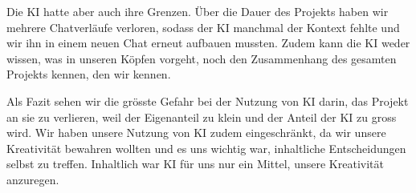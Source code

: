 \documentclass[../Main.tex]{subfiles}
\begin{document}
Die KI hatte aber auch ihre Grenzen. Über die Dauer des Projekts haben wir mehrere Chatverläufe verloren, sodass der KI manchmal der Kontext fehlte und wir ihn in einem neuen Chat erneut aufbauen mussten. Zudem kann die KI weder wissen, was in unseren Köpfen vorgeht, noch den Zusammenhang des gesamten Projekts kennen, den wir kennen.

Als Fazit sehen wir die grösste Gefahr bei der Nutzung von KI darin, das Projekt an sie zu verlieren, weil der Eigenanteil zu klein und der Anteil der KI zu gross wird. Wir haben unsere Nutzung von KI zudem eingeschränkt, da wir unsere Kreativität bewahren wollten und es uns wichtig war, inhaltliche Entscheidungen selbst zu treffen. Inhaltlich war KI für uns nur ein Mittel, unsere Kreativität anzuregen.
\end{document}
